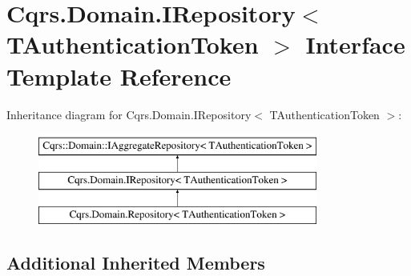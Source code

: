 \hypertarget{interfaceCqrs_1_1Domain_1_1IRepository}{}\section{Cqrs.\+Domain.\+I\+Repository$<$ T\+Authentication\+Token $>$ Interface Template Reference}
\label{interfaceCqrs_1_1Domain_1_1IRepository}
Inheritance diagram for Cqrs.\+Domain.\+I\+Repository$<$ T\+Authentication\+Token $>$\+:\begin{figure}[H]
\begin{center}
\leavevmode
\includegraphics[height=3.000000cm]{interfaceCqrs_1_1Domain_1_1IRepository}
\end{center}
\end{figure}
\subsection*{Additional Inherited Members}
